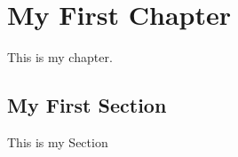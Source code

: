 \documentclass[../../main.tex]{subfiles}
\begin{document}
\graphicspath{ {./assets/} }

\chapter{My First Chapter}
\label{ch:my-first-chapter}

This is my chapter.

\section{My First Section}
\label{sec:my-first-chapter:my-first-section}

This is my Section
\end{document}
